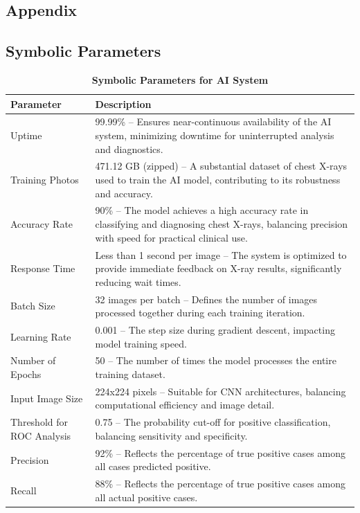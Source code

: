 \documentclass[12pt, titlepage]{article}
\begin{document}
\begin{enumerate}
\newpage



\newpage

\section{Appendix}

\subsection{Symbolic Parameters}
\renewcommand{\arraystretch}{1.3}

\begin{table}[H]
  \centering
  \noindent
  \begin{tabular}{|p{3.5cm}|p{9.5cm}|}
      \hline
      \rowcolor{lightgray} \textbf{Parameter} & \textbf{Description} \\
      \hline
      Uptime & 99.99\% – Ensures near-continuous availability of the AI system, minimizing downtime for uninterrupted analysis and diagnostics. \\
      \hline
      Training Photos & 471.12 GB (zipped) – A substantial dataset of chest X-rays used to train the AI model, contributing to its robustness and accuracy. \\
      \hline
      Accuracy Rate & 90\% – The model achieves a high accuracy rate in classifying and diagnosing chest X-rays, balancing precision with speed for practical clinical use. \\
      \hline
      Response Time & Less than 1 second per image – The system is optimized to provide immediate feedback on X-ray results, significantly reducing wait times. \\
      \hline
      Batch Size & 32 images per batch – Defines the number of images processed together during each training iteration. \\
      \hline
      Learning Rate & 0.001 – The step size during gradient descent, impacting model training speed. \\
      \hline
      Number of Epochs & 50 – The number of times the model processes the entire training dataset. \\
      \hline
      Input Image Size & 224x224 pixels – Suitable for CNN architectures, balancing computational efficiency and image detail. \\
      \hline
      Threshold for ROC Analysis & 0.75 – The probability cut-off for positive classification, balancing sensitivity and specificity. \\
      \hline
      Precision & 92\% – Reflects the percentage of true positive cases among all cases predicted positive. \\
      \hline
      Recall & 88\% – Reflects the percentage of true positive cases among all actual positive cases. \\
      \hline
  \end{tabular}
  \caption{\textbf{Symbolic Parameters for AI System}}
\end{table}



\end{enumerate}
\end{document}
